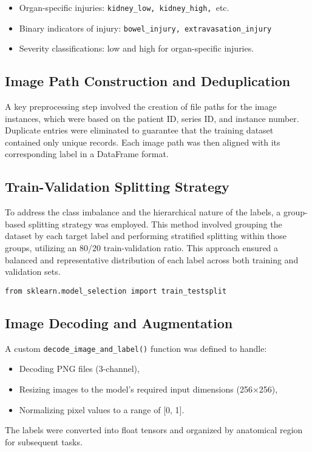 \documentclass[a4paper,12pt]{article}
\begin{document}
\begin{itemize}
    \item Organ-specific injuries: \verb|kidney_low, kidney_high, |etc.
    \item Binary indicators of injury: \verb|bowel_injury, extravasation_injury|
    \item Severity classifications: low and high for organ-specific injuries.
\end{itemize}


\subsection{Image Path Construction and Deduplication}
A key preprocessing step involved the creation of file paths for the image instances, which were based on the patient ID, series ID, and instance number. Duplicate entries were eliminated to guarantee that the training dataset contained only unique records. Each image path was then aligned with its corresponding label in a DataFrame format.

\subsection{Train-Validation Splitting Strategy}
To address the class imbalance and the hierarchical nature of the labels, a group-based splitting strategy was employed. This method involved grouping the dataset by each target label and performing stratified splitting within those groups, utilizing an 80/20 train-validation ratio. This approach ensured a balanced and representative distribution of each label across both training and validation sets.

\verb|from sklearn.model_selection import train_testsplit|


\subsection{Image Decoding and Augmentation}
A custom \verb|decode_image_and_label()| function was defined to handle:
\begin{itemize}

    \item Decoding PNG files (3-channel),
    \item Resizing images to the model’s required input dimensions (256×256),
    \item Normalizing pixel values to a range of [0, 1].

\end{itemize}
The labels were converted into float tensors and organized by anatomical region for subsequent tasks.\\
\end{document}
